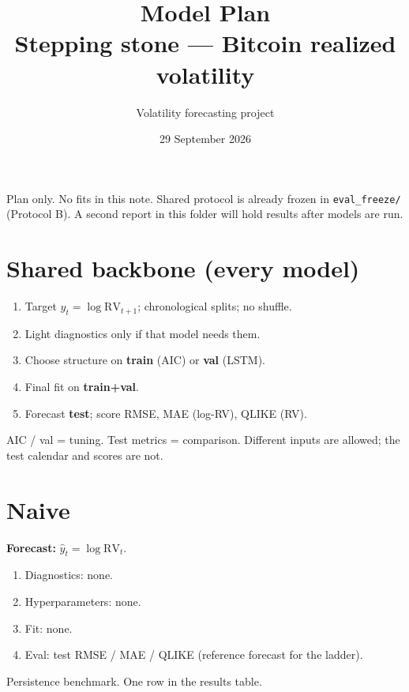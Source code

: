 \documentclass[12pt]{article}
\title{Model Plan\\[0.2em]
\large Stepping stone --- Bitcoin realized volatility}
\author{Volatility forecasting project}
\date{29 September 2026}
\begin{document}
\maketitle

\noindent
Plan only. No fits in this note.
Shared protocol is already frozen in \texttt{eval\_freeze/} (Protocol B).
A second report in this folder will hold results after models are run.

\section{Shared backbone (every model)}
\begin{enumerate}
  \item Target \(y_t=\log\mathrm{RV}_{t+1}\); chronological splits; no shuffle.
  \item Light diagnostics only if that model needs them.
  \item Choose structure on \textbf{train} (AIC) or \textbf{val} (LSTM).
  \item Final fit on \textbf{train+val}.
  \item Forecast \textbf{test}; score RMSE, MAE (log-RV), QLIKE (RV).
\end{enumerate}
\begin{explain}
AIC / val = tuning. Test metrics = comparison.
Different inputs are allowed; the test calendar and scores are not.
\end{explain}

\section{Naive}
\textbf{Forecast:} \(\hat y_t=\log\mathrm{RV}_t\).
\begin{enumerate}
  \item Diagnostics: none.
  \item Hyperparameters: none.
  \item Fit: none.
  \item Eval: test RMSE / MAE / QLIKE (reference forecast for the ladder).
\end{enumerate}
\begin{explain}
Persistence benchmark. One row in the results table.
\end{explain}
\end{document}

